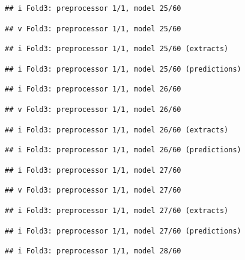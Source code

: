 \documentclass[
]{article}
\begin{document}
\begin{verbatim}
## i Fold3: preprocessor 1/1, model 25/60
\end{verbatim}

\begin{verbatim}
## v Fold3: preprocessor 1/1, model 25/60
\end{verbatim}

\begin{verbatim}
## i Fold3: preprocessor 1/1, model 25/60 (extracts)
\end{verbatim}

\begin{verbatim}
## i Fold3: preprocessor 1/1, model 25/60 (predictions)
\end{verbatim}

\begin{verbatim}
## i Fold3: preprocessor 1/1, model 26/60
\end{verbatim}

\begin{verbatim}
## v Fold3: preprocessor 1/1, model 26/60
\end{verbatim}

\begin{verbatim}
## i Fold3: preprocessor 1/1, model 26/60 (extracts)
\end{verbatim}

\begin{verbatim}
## i Fold3: preprocessor 1/1, model 26/60 (predictions)
\end{verbatim}

\begin{verbatim}
## i Fold3: preprocessor 1/1, model 27/60
\end{verbatim}

\begin{verbatim}
## v Fold3: preprocessor 1/1, model 27/60
\end{verbatim}

\begin{verbatim}
## i Fold3: preprocessor 1/1, model 27/60 (extracts)
\end{verbatim}

\begin{verbatim}
## i Fold3: preprocessor 1/1, model 27/60 (predictions)
\end{verbatim}

\begin{verbatim}
## i Fold3: preprocessor 1/1, model 28/60
\end{verbatim}
\end{document}
